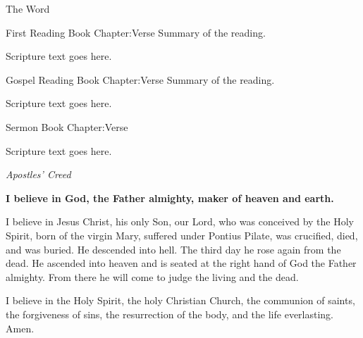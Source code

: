 \vspace{1.0em}%
\begin{center}
  {\headingfont\fontsize{14}{17}\selectfont \litcross\enskip The Word\enskip\litcross}
\end{center}
\vspace{0.45em}%

\reading
{First Reading}
{Book Chapter:Verse}
{Summary of the reading.}

\begin{scripture}
Scripture text goes here.
\end{scripture}

\reading
{Gospel Reading}
{Book Chapter:Verse}
{Summary of the reading.}

\begin{scripture}
Scripture text goes here.
\end{scripture}

\reading
{Sermon}
{Book Chapter:Verse}
{}

\begin{scripture}
Scripture text goes here.
\end{scripture}

\vspace{0.8em}
 \textit{Apostles' Creed}\par
\vspace{0.35em}
\begin{corporatetext}
\setlength{\parskip}{1.5em}
{\bfseries
I believe in God, the Father almighty, maker of heaven and earth.

I believe in Jesus Christ, his only Son, our Lord, who was conceived by the Holy Spirit,
born of the virgin Mary, suffered under Pontius Pilate, was crucified, died, and was buried.
He descended into hell. The third day he rose again from the dead. He ascended into heaven
and is seated at the right hand of God the Father almighty. From there he will come to judge
the living and the dead.

I believe in the Holy Spirit, the holy Christian Church, the communion of saints, the forgiveness
of sins, the resurrection of the body, and the life everlasting. Amen.
}
\end{corporatetext}

